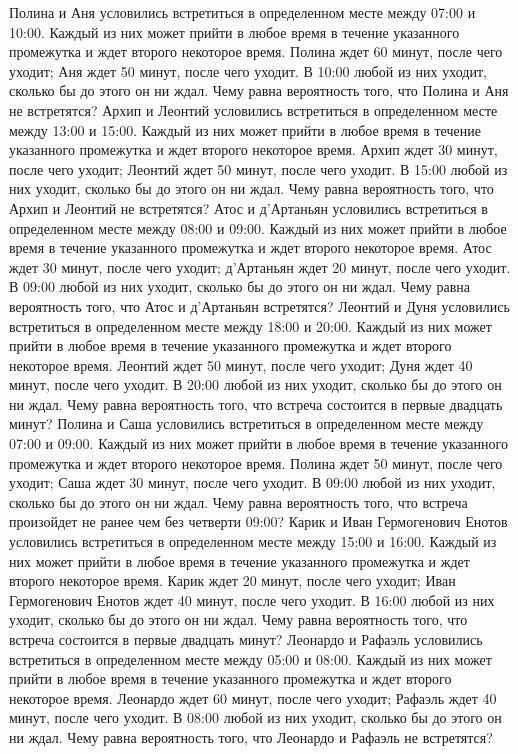 Полина и Аня условились встретиться в определенном месте между 07:00 и 10:00. Каждый из них может прийти в любое время в течение указанного промежутка и ждет второго некоторое время. Полина ждет 60 минут, после чего уходит; Аня ждет 50 минут, после чего уходит. В 10:00 любой из них уходит, сколько бы до этого он ни ждал. Чему равна вероятность того, что Полина и Аня не встретятся?
Архип и Леонтий условились встретиться в определенном месте между 13:00 и 15:00. Каждый из них может прийти в любое время в течение указанного промежутка и ждет второго некоторое время. Архип ждет 30 минут, после чего уходит; Леонтий ждет 50 минут, после чего уходит. В 15:00 любой из них уходит, сколько бы до этого он ни ждал. Чему равна вероятность того, что Архип и Леонтий не встретятся?
Атос и д'Артаньян условились встретиться в определенном месте между 08:00 и 09:00. Каждый из них может прийти в любое время в течение указанного промежутка и ждет второго некоторое время. Атос ждет 30 минут, после чего уходит; д'Артаньян ждет 20 минут, после чего уходит. В 09:00 любой из них уходит, сколько бы до этого он ни ждал. Чему равна вероятность того, что Атос и д'Артаньян встретятся?
Леонтий и Дуня условились встретиться в определенном месте между 18:00 и 20:00. Каждый из них может прийти в любое время в течение указанного промежутка и ждет второго некоторое время. Леонтий ждет 50 минут, после чего уходит; Дуня ждет 40 минут, после чего уходит. В 20:00 любой из них уходит, сколько бы до этого он ни ждал. Чему равна вероятность того, что встреча состоится в первые двадцать минут?
Полина и Саша условились встретиться в определенном месте между 07:00 и 09:00. Каждый из них может прийти в любое время в течение указанного промежутка и ждет второго некоторое время. Полина ждет 50 минут, после чего уходит; Саша ждет 30 минут, после чего уходит. В 09:00 любой из них уходит, сколько бы до этого он ни ждал. Чему равна вероятность того, что встреча произойдет не ранее чем без четверти 09:00?
Карик и Иван Гермогенович Енотов условились встретиться в определенном месте между 15:00 и 16:00. Каждый из них может прийти в любое время в течение указанного промежутка и ждет второго некоторое время. Карик ждет 20 минут, после чего уходит; Иван Гермогенович Енотов ждет 40 минут, после чего уходит. В 16:00 любой из них уходит, сколько бы до этого он ни ждал. Чему равна вероятность того, что встреча состоится в первые двадцать минут?
Леонардо и Рафаэль условились встретиться в определенном месте между 05:00 и 08:00. Каждый из них может прийти в любое время в течение указанного промежутка и ждет второго некоторое время. Леонардо ждет 60 минут, после чего уходит; Рафаэль ждет 40 минут, после чего уходит. В 08:00 любой из них уходит, сколько бы до этого он ни ждал. Чему равна вероятность того, что Леонардо и Рафаэль не встретятся?
